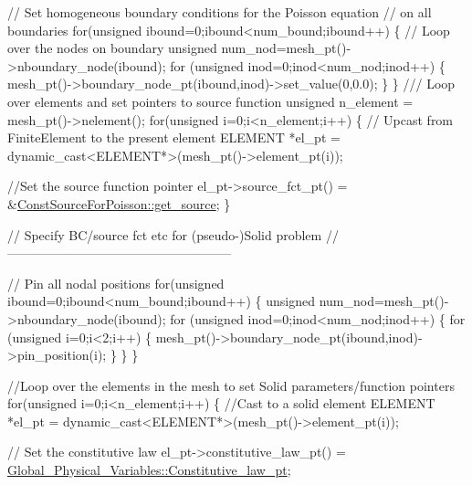 \begin{DoxyCodeInclude}
 \textcolor{comment}{// Set homogeneous boundary conditions for the Poisson equation }
 \textcolor{comment}{// on all boundaries }
 \textcolor{keywordflow}{for}(\textcolor{keywordtype}{unsigned} ibound=0;ibound<num\_bound;ibound++)
  \{
   \textcolor{comment}{// Loop over the nodes on boundary}
   \textcolor{keywordtype}{unsigned} num\_nod=mesh\_pt()->nboundary\_node(ibound);
   \textcolor{keywordflow}{for} (\textcolor{keywordtype}{unsigned} inod=0;inod<num\_nod;inod++)
    \{
     mesh\_pt()->boundary\_node\_pt(ibound,inod)->set\_value(0,0.0);
    \}
  \}
 \textcolor{comment}{}
\textcolor{comment}{ /// Loop over elements and set pointers to source function}
\textcolor{comment}{} \textcolor{keywordtype}{unsigned} n\_element = mesh\_pt()->nelement();
 \textcolor{keywordflow}{for}(\textcolor{keywordtype}{unsigned} i=0;i<n\_element;i++)
  \{
   \textcolor{comment}{// Upcast from FiniteElement to the present element}
   ELEMENT *el\_pt = \textcolor{keyword}{dynamic\_cast<}ELEMENT*\textcolor{keyword}{>}(mesh\_pt()->element\_pt(i));
   
   \textcolor{comment}{//Set the source function pointer}
   el\_pt->source\_fct\_pt() = &\hyperlink{namespaceConstSourceForPoisson_a40ef79083874b58ed42b4df2ca0f4c10}{ConstSourceForPoisson::get\_source};
  \}


 \textcolor{comment}{// Specify BC/source fct etc for (pseudo-)Solid problem}
 \textcolor{comment}{//-----------------------------------------------------}

 \textcolor{comment}{// Pin all nodal positions}
 \textcolor{keywordflow}{for}(\textcolor{keywordtype}{unsigned} ibound=0;ibound<num\_bound;ibound++)
  \{
   \textcolor{keywordtype}{unsigned} num\_nod=mesh\_pt()->nboundary\_node(ibound);
   \textcolor{keywordflow}{for} (\textcolor{keywordtype}{unsigned} inod=0;inod<num\_nod;inod++)
    \{
     \textcolor{keywordflow}{for} (\textcolor{keywordtype}{unsigned} i=0;i<2;i++)
      \{
       mesh\_pt()->boundary\_node\_pt(ibound,inod)->pin\_position(i); 
      \}
    \}
  \}

 \textcolor{comment}{//Loop over the elements in the mesh to set Solid parameters/function pointers}
 \textcolor{keywordflow}{for}(\textcolor{keywordtype}{unsigned} i=0;i<n\_element;i++)
  \{
   \textcolor{comment}{//Cast to a solid element}
   ELEMENT *el\_pt = \textcolor{keyword}{dynamic\_cast<}ELEMENT*\textcolor{keyword}{>}(mesh\_pt()->element\_pt(i));
   
   \textcolor{comment}{// Set the constitutive law}
   el\_pt->constitutive\_law\_pt() =
    \hyperlink{namespaceGlobal__Physical__Variables_a5d5f19442938130d36ee7476ae25049c}{Global\_Physical\_Variables::Constitutive\_law\_pt};
     

\end{DoxyCodeInclude}
